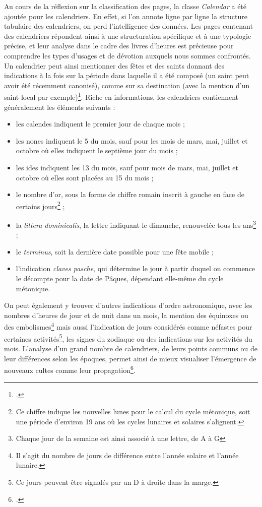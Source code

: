 \documentclass[a4paper,12pt,twoside]{book}
\begin{document}
    Au cours de la réflexion sur la classification des pages, la classe \textit{Calendar} a été ajoutée pour les calendriers. En effet, si l’on annote ligne par ligne la structure tabulaire des calendriers, on perd l’intelligence des données. Les pages contenant des calendriers répondent ainsi à une structuration spécifique et à une typologie précise, et leur analyse dans le cadre des livres d'heures est précieuse pour comprendre les types d'usages et de dévotion auxquels nous sommes confrontés. Un calendrier peut ainsi mentionner des fêtes et des saints donnant des indications à la fois sur la période dans laquelle il a été composé (un saint peut avoir été récemment canonisé), comme sur sa destination (avec la mention d'un saint local par exemple)\footcite[p. 767]{analyse_calendrier}. Riche en informations, les calendriers contiennent généralement les éléments suivants : 
    \begin{itemize}
        \item les calendes indiquent le premier jour de chaque mois ;
        \item les nones indiquent le 5 du mois, sauf pour les mois de mars, mai, juillet et octobre où elles indiquent le septième jour du mois ;
        \item les ides indiquent les 13 du mois, sauf pour mois de mars, mai, juillet et octobre où elles sont placées au 15 du mois ;
        \item le nombre d'or, sous la forme de chiffre romain inscrit à gauche en face de certains jours\footnote{Ce chiffre indique les nouvelles lunes pour le calcul du cycle métonique, soit une période d'environ 19 ans où les cycles lunaires et solaires s'alignent.} ;
        \item la \textit{littera dominicalis}, la lettre indiquant le dimanche, renouvelée tous les ans\footnote{Chaque jour de la semaine est ainsi associé à une lettre, de A à G} ;
        \item le \textit{terminus}, soit la dernière date possible pour une fête mobile ;
        \item l'indication \textit{claves pasche}, qui détermine le jour à partir duquel on commence le décompte pour la date de Pâques, dépendant elle-même du cycle métonique.
    \end{itemize}
    
    On peut également y trouver d'autres indications d'ordre astronomique, avec les nombres d'heures de jour et de nuit dans un mois, la mention des équinoxes ou des embolismes\footnote{Il s'agit du nombre de jours de différence entre l'année solaire et l'année lunaire.} mais aussi l'indication de jours considérés comme néfastes pour certaines activités\footnote{Ce jours peuvent être signalés par un \og D\fg{} à droite dans la marge.}, les signes du zodiaque ou des indications sur les activités du mois. L'analyse d'un grand nombre de calendriers, de leurs points communs ou de leur différences selon les époques, permet ainsi de mieux visualiser l'émergence de nouveaux cultes comme leur propagation\footcite[p. 768]{analyse_calendrier}. \\
    
\end{document}
